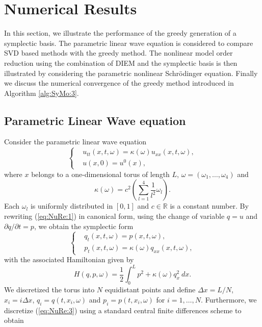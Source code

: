 \section{Numerical Results} \label{chap:NuRe:1}
In this section, we illustrate the performance of the greedy generation of a symplectic basis. The parametric linear wave equation is considered to compare SVD based methods with the greedy method. The nonlinear model order reduction using the combination of DIEM and the symplectic basis is then illustrated by considering the parametric nonlinear Schr\"odinger equation. {\edit Finally we discuss the numerical convergence of the greedy method introduced in Algorithm \ref{alg:SyMo:3}.}

\subsection{Parametric Linear Wave equation} \label{chap:NuRe:1.1} Consider the {\edit parametric} linear wave equation
\begin{equation} \label{eq:NuRe:1}
\left\{
\begin{aligned}
& u_{tt}(x,t,\omega) = \kappa(\omega) u_{xx}(x,t,\omega), \\
& u(x,0) = u^0(x),
\end{aligned}
\right.
\end{equation}
where $x$ belongs to a one-dimensional torus of length $L$, $\omega = (\omega_1,\dots,\omega_4)$ and
\begin{equation} \label{eq:NuRe:2}
	\kappa(\omega) = c^2\left( \sum_{l=1}^4 \frac{1}{l^2} \omega_l \right).
\end{equation}
Each $\omega_l$ is uniformly distributed in $[0,1]$ and $c\in \mathbb{R}$ is a constant number. By rewriting (\ref{eq:NuRe:1}) in canonical form, using the change of variable $q = u$ and $\partial q/ \partial t= p$, we obtain the symplectic form
\begin{equation} \label{eq:NuRe:3}
\left\{
\begin{aligned}
& q_t(x,t,\omega) = p(x,t,\omega), \\
& p_t(x,t,\omega) = \kappa(\omega) q_{xx}(x,t,\omega),
\end{aligned}
\right.
\end{equation}
with the associated Hamiltonian given by
\begin{equation} \label{eq:NuRe:4}
	H(q,p,\omega) = \frac 1 2 \int_0^L p^2 + \kappa(\omega) q_x^2 \ dx.
\end{equation}
We discretized the torus into $N$ equidistant points and define $\Delta x = L/N$, $x_i = i\Delta x$, $q_i=q(t,x_i,\omega)$ and $p_i=p(t,x_i,\omega)$ for $i = 1, \dots, N$. Furthermore, we discretize (\ref{eq:NuRe:3}) using a standard central finite differences scheme to obtain
